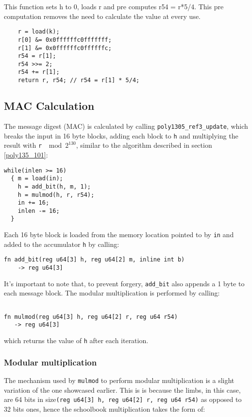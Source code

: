\documentclass{article}
\begin{document}
This function sets h to 0, loads r and pre computes r54 = r*5/4. This pre computation removes the need to calculate the value at every use.
\begin{Verbatim}
    r = load(k);
    r[0] &= 0x0ffffffc0fffffff;
    r[1] &= 0x0ffffffc0ffffffc;
    r54 = r[1];
    r54 >>= 2;
    r54 += r[1];
    return r, r54; // r54 = r[1] * 5/4;
\end{Verbatim}

\subsection{MAC Calculation}
The message digest (MAC) is calculated by calling \texttt{poly1305\_ref3\_update}, which breaks the input in 16 byte blocks, adding each block to \texttt{h} 
and multiplying the result with \texttt{r} $\mod 2^{130}$, similar to the algorithm described in section \ref{poly135_101}:
\begin{Verbatim}
while(inlen >= 16)
  { m = load(in);
    h = add_bit(h, m, 1);
    h = mulmod(h, r, r54);
    in += 16;
    inlen -= 16;
  }
\end{Verbatim}

Each 16 byte block is loaded from the memory location pointed to by \texttt{in} and added to the accumulator \texttt{h} by calling:
\begin{Verbatim}
fn add_bit(reg u64[3] h, reg u64[2] m, inline int b) 
    -> reg u64[3]
\end{Verbatim}

It's important to note that, to prevent forgery, \texttt{add\_bit} also appends a 1 byte to each message block. The modular multiplication is performed by calling:
\begin{Verbatim}

fn mulmod(reg u64[3] h, reg u64[2] r, reg u64 r54) 
   -> reg u64[3]

\end{Verbatim}
which returns the value of \texttt{h} after each iteration.

\subsubsection{Modular multiplication}
The mechanism used by \texttt{mulmod} to perform modular multiplication is a slight variation of the one showcased earlier. This is is because the limbs, in
this case, are 64 bits in size\texttt{(reg u64[3] h, reg u64[2] r, reg u64 r54)} as opposed to 32 bits ones, hence the schoolbook multiplication takes the form 
of:
\end{document}
